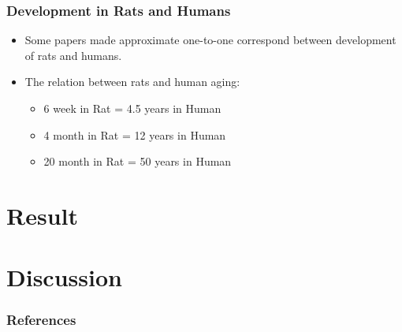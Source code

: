 \documentclass{beamer}
\begin{document}
	\begin{frame}
		\frametitle{Development in Rats and Humans}
		\begin{itemize}
			\item Some papers made approximate one-to-one correspond between development of rats and humans. \cite{ref:dev2}
			\item The relation between rats and human aging:
			\begin{itemize}
				\item 6 week in Rat = 4.5 years in Human
				\item 4 month in Rat = 12 years in Human
				\item 20 month in Rat = 50 years in Human
			\end{itemize}
		\end{itemize}
	\end{frame}
	
	\section{Result}
	
	\section{Discussion}
	
	\begin{frame}[allowframebreaks]
		\frametitle{References}
		
		
	\end{frame}
\end{document}
